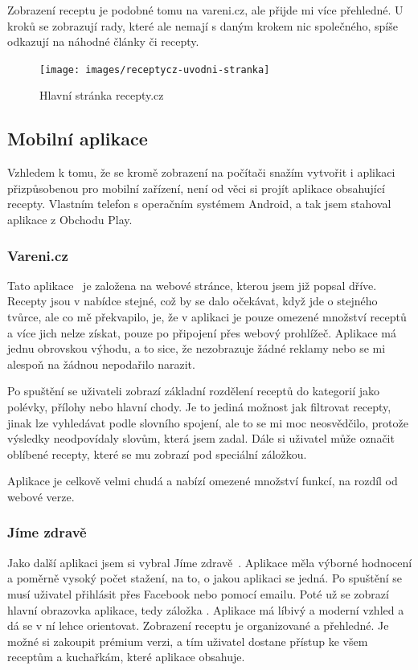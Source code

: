Zobrazení receptu je podobné tomu na vareni.cz, ale přijde mi více přehledné. U kroků se zobrazují rady, které ale
nemají s daným krokem nic společného, spíše odkazují na náhodné články či recepty.

\newpage

\begin{figure}[H]
    \texttt{[image: images/receptycz-uvodni-stranka]}
    \caption{Hlavní stránka recepty.cz} \label{picture:receptycz:uvodni-stranka}
\end{figure}

\subsection{Mobilní aplikace}

Vzhledem k tomu, že se kromě zobrazení na počítači snažím vytvořit i aplikaci přizpůsobenou pro mobilní zařízení, není od věci
si projít aplikace obsahující recepty. Vlastním telefon s operačním systémem Android, a tak jsem stahoval aplikace z Obchodu Play.

\subsubsection{Vareni.cz}
Tato aplikace~\cite{VareniCZAplikace} je založena na webové stránce, kterou jsem již popsal dříve. Recepty jsou v nabídce stejné, což by se dalo očekávat,
když jde o stejného tvůrce, ale co mě překvapilo, je, že v aplikaci je pouze omezené množství receptů a více jich nelze získat, pouze
po připojení přes webový prohlížeč. Aplikace má jednu obrovskou výhodu, a to sice, že nezobrazuje žádné reklamy nebo se mi alespoň na
žádnou nepodařilo narazit.

Po spuštění se uživateli zobrazí základní rozdělení receptů do kategorií jako polévky, přílohy nebo hlavní chody. Je to jediná možnost
jak filtrovat recepty, jinak lze vyhledávat podle slovního spojení, ale to se mi moc neosvědčilo, protože výsledky neodpovídaly slovům,
která jsem zadal. Dále si uživatel může označit oblíbené recepty, které se mu zobrazí pod speciální záložkou.

Aplikace je celkově velmi chudá a nabízí omezené množství funkcí, na rozdíl od webové verze.

\subsubsection{Jíme zdravě}
Jako další aplikaci jsem si vybral Jíme zdravě~\cite{JimeZdrave}. Aplikace měla výborné hodnocení a poměrně vysoký počet stažení, na to, o jakou aplikaci se jedná.
Po spuštění se musí uživatel přihlásit přes Facebook nebo pomocí emailu. Poté už se zobrazí hlavní obrazovka aplikace, tedy záložka .
Aplikace má líbivý a moderní vzhled a dá se v ní lehce orientovat. Zobrazení receptu je organizované a přehledné. Je možné si zakoupit
prémium verzi, a tím uživatel dostane přístup ke všem receptům a kuchařkám, které aplikace obsahuje.

